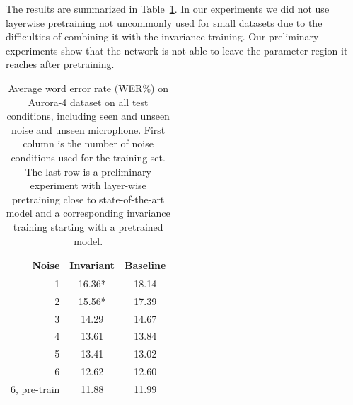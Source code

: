\documentclass{article}
\begin{document}
The results are summarized in Table~\ref{tab:results}. 
In our experiments we did not use layerwise pretraining not uncommonly used for small
datasets due to the difficulties of combining it with the invariance training. Our preliminary
experiments show that the network is not able to leave the parameter region it reaches after 
pretraining.


\begin{table}
    \centering
    \caption{Average word error rate (WER\%) on Aurora-4 dataset on all test conditions,
        including seen and unseen noise and unseen microphone. First column
        is the number of noise conditions used for the training set. The last row is a 
        preliminary experiment with layer-wise pretraining close to state-of-the-art
        model and a corresponding invariance training starting with a pretrained model.}
    \label{tab:results}
    \begin{tabular}{r|cc}
    Noise       &Invariant    &Baseline\\
    \hline
    1           &16.36*       &18.14 \\
    2           &15.56*       &17.39 \\
    3           &14.29        &14.67 \\
    4           &13.61        &13.84 \\         
    5           &13.41        &13.02 \\         
    6           &12.62        &12.60 \\
    \hline\hline
    6, pre-train&11.88        &11.99
    \end{tabular}
\end{table}
\end{document}
